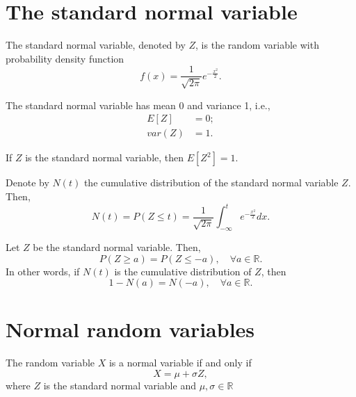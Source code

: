 \section{The standard normal variable}
The standard normal variable, denoted by $ Z $, is the random variable with
    probability density function
\begin{equation}
    f(x) = \frac{1}{\sqrt{2 \pi}} e^{-\frac{x^2}{2}}.
    \label{eq:standard-pdf}
\end{equation}

\begin{lemma}
    The standard normal variable has mean 0 and variance 1, i.e.,
    \begin{align}
        E[Z] &= 0; \label{eq:standard-expected-value} \\
        var(Z) &= 1. \label{eq:standard-variance}
    \end{align}
\end{lemma}

\begin{lemma}
    If $ Z $ is the standard normal variable, then $ E[Z^2] = 1 $.
\end{lemma}

\begin{definition}
    Denote by $ N(t) $ the cumulative distribution of the standard normal
        variable $ Z $.
    Then,
    \begin{equation}
        N(t) = P(Z \leq t) = \frac{1}{\sqrt{2 \pi}} \int_{-\infty}^{t}
            e^{-\frac{x^2}{2}} dx.
    \end{equation}
\end{definition}

\begin{lemma}
    Let $ Z $ be the standard normal variable.
    Then,
    \begin{equation}
        P(Z \geq a) = P(Z \leq -a), \quad \forall a \in \mathbb{R}.
    \end{equation}
    In other words, if $ N(t) $ is the cumulative distribution of $ Z $, then
    \begin{equation}
        1 - N(a) = N(-a), \quad \forall a \in \mathbb{R}.
    \end{equation}
\end{lemma}

\section{Normal random variables}
\begin{definition}
    The random variable $ X $ is a normal variable if and only if
    \begin{equation}
        X = \mu + \sigma Z,
    \end{equation}
    where $ Z $ is the standard normal variable and
        $ \mu, \sigma \in \mathbb{R} $
\end{definition}

